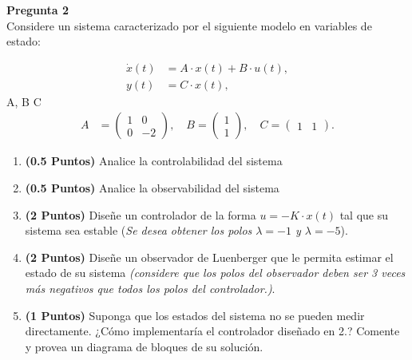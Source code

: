 \setlength\parindent{0pt} \textbf{\large Pregunta 2} \\
Considere un sistema caracterizado por el siguiente modelo en variables de estado:

\begin{align}
\dot{x}(t) &= A\cdot  x(t) + B \cdot  u(t), \\
y(t) &= C \cdot x(t),
\end{align}
 A, B  C 
\begin{align}
A &= \begin{pmatrix}
1 & 0 \\
0 & -2
\end{pmatrix}, \quad
B = \begin{pmatrix}
1 \\
1
\end{pmatrix}, \quad
C = \begin{pmatrix}
1 & 1
\end{pmatrix}.
\end{align}
\begin{enumerate}
    \item \textbf{(0.5 Puntos)} Analice la controlabilidad del sistema
    \item \textbf{(0.5 Puntos)} Analice la observabilidad del sistema
    \item \textbf{(2 Puntos)} Diseñe un controlador de la forma $u = -K\cdot x(t)$ tal que su sistema sea estable (\textit{Se desea obtener los polos $\lambda= -1$ y $\lambda = -5$}). 
    \item \textbf{(2 Puntos)} Diseñe un observador de Luenberger que le permita estimar el estado de su sistema \textit{(considere que los polos del observador deben ser 3 veces más negativos que todos los polos del controlador.)}.
     \item \textbf{(1 Puntos)} Suponga que los estados del sistema no se pueden medir directamente. ¿Cómo implementaría el controlador diseñado en 2.? Comente y provea un diagrama de bloques de su solución.
\end{enumerate}


